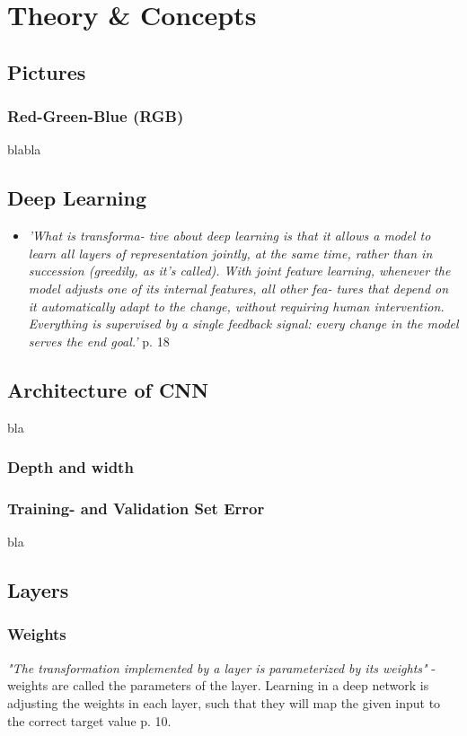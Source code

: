 \documentclass[a4paper,11pt]{article}
\begin{document}
\section{Theory \& Concepts}
\subsection{Pictures}
\subsubsection{Red-Green-Blue (RGB)}
blabla
\subsection{Deep Learning}
\begin{itemize}
	\item \textit{'What is transforma-
	tive about deep learning is that it allows a model to learn all layers of representation
	jointly, at the same time, rather than in succession (greedily, as it’s called). With joint
	feature learning, whenever the model adjusts one of its internal features, all other fea-
	tures that depend on it automatically adapt to the change, without requiring human
	intervention. Everything is supervised by a single feedback signal: every change in the
	model serves the end goal.'} \cite{Chollet-et-al-2018} p. 18
\end{itemize}
\subsection{Architecture of CNN}
bla
\subsubsection{Depth and width}
\subsubsection{Training- and Validation Set Error}
bla
\subsection{Layers}
\subsubsection{Weights}
\textit{"The	transformation implemented by a layer is parameterized by its weights"} - weights are called the parameters of the layer. Learning in a deep network is adjusting the weights in each layer, such that they will map the given input to the correct target value \cite{Chollet-et-al-2018} p. 10.
\end{document}
